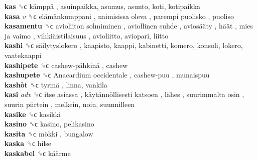 \textbf{kas} ␝ϲ   kämppä , asuinpaikka, asumus, asunto, koti, kotipaikka  \\
\textbf{kasa} \emph{v}  ␝ϲ   elämänkumppani ,  naimisissa oleva ,  parempi puolisko , puoliso  \\
\textbf{kasamentu} ␝ϲ   avioliiton solmiminen ,  aviollinen suhde ,  aviosääty ,  häät ,  mies ja vaimo ,  vihkiäistilaisuus , avioliitto, aviopari, liitto  \\
\textbf{kashi} ␝ϲ   säilytyslokero , kaapisto, kaappi, kabinetti, komero, konsoli, lokero, vaatekaappi  \\
\textbf{kashipete} ␝ϲ   cashew-pähkinä , cashew  \\
\textbf{kashupete} ␝ϲ   Anacardium occidentale ,  cashew-puu , munaispuu  \\
\textbf{kashòt} ␝ϲ   tyrmä , linna, vankila  \\
\textbf{kasi} \emph{adv}  ␝ϲ   itse asiassa ,  käytännöllisesti katsoen ,  lähes ,  suurimmalta osin ,  suurin piirtein , melkein, noin, suunnilleen  \\
\textbf{kasike} ␝ϲ  kasikki  \\
\textbf{kasino} ␝ϲ  kasino, pelikasino  \\
\textbf{kasita} ␝ϲ   mökki , bungalow  \\
\textbf{kaska} ␝ϲ  hilse  \\
\textbf{kaskabel} ␝ϲ   käärme   \\
